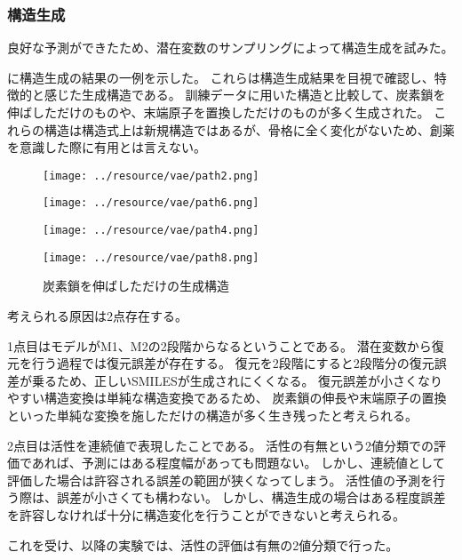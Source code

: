 \subsubsection{構造生成}

良好な予測ができたため、潜在変数のサンプリングによって構造生成を試みた。

に構造生成の結果の一例を示した。
これらは構造生成結果を目視で確認し、特徴的と感じた生成構造である。
訓練データに用いた構造と比較して、炭素鎖を伸ばしただけのものや、末端原子を置換しただけのものが多く生成された。
これらの構造は構造式上は新規構造ではあるが、骨格に全く変化がないため、創薬を意識した際に有用とは言えない。
\begin{figure}[tbp]
    \begin{minipage}[b]{0.49\hsize}
    \centering
    \texttt{[image: ../resource/vae/path2.png]} 
    \end{minipage}
    \begin{minipage}[b]{0.49\hsize}    
    \centering
    \texttt{[image: ../resource/vae/path6.png]}
    \end{minipage}

    \begin{minipage}[b]{0.49\hsize}    
        \centering
        \texttt{[image: ../resource/vae/path4.png]}
    \end{minipage}
    \begin{minipage}[b]{0.49\hsize}    
        \centering
        \texttt{[image: ../resource/vae/path8.png]}
    \end{minipage}
\caption{炭素鎖を伸ばしただけの生成構造} \label{fig:vae_carbon_chain}
\end{figure}

考えられる原因は2点存在する。

1点目はモデルがM1、M2の2段階からなるということである。
潜在変数から復元を行う過程では復元誤差が存在する。
復元を2段階にすると2段階分の復元誤差が乗るため、正しいSMILESが生成されにくくなる。
復元誤差が小さくなりやすい構造変換は単純な構造変換であるため、
炭素鎖の伸長や末端原子の置換といった単純な変換を施しただけの構造が多く生き残ったと考えられる。

2点目は活性を連続値で表現したことである。
活性の有無という2値分類での評価であれば、予測にはある程度幅があっても問題ない。
しかし、連続値として評価した場合は許容される誤差の範囲が狭くなってしまう。
活性値の予測を行う際は、誤差が小さくても構わない。
しかし、構造生成の場合はある程度誤差を許容しなければ十分に構造変化を行うことができないと考えられる。

これを受け、以降の実験では、活性の評価は有無の2値分類で行った。